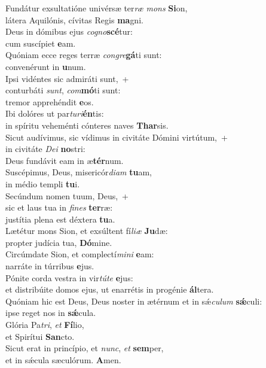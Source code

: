 \evenverse Fundátur exsultatióne univérsæ ter\textit{ræ} \textit{mons} \textbf{Si}on,~\*\\
\evenverse látera Aquilónis, cívitas Regis \textbf{ma}gni.\\
\oddverse Deus in dómibus ejus \textit{co}\textit{gno}\textbf{scé}tur:~\*\\
\oddverse cum suscípiet \textbf{e}am.\\
\evenverse Quóniam ecce reges terræ \textit{con}\textit{gre}\textbf{gá}ti sunt:~\*\\
\evenverse convenérunt in \textbf{u}num.\\
\oddverse Ipsi vidéntes sic admiráti sunt,~+\\
\oddverse  conturbáti \textit{sunt}, \textit{com}\textbf{mó}ti sunt:~\*\\
\oddverse tremor apprehéndit \textbf{e}os.\\
\evenverse Ibi dolóres ut par\textit{tu}\textit{ri}\textbf{én}tis:~\*\\
\evenverse in spíritu veheménti cónteres naves \textbf{Thar}sis.\\
\oddverse Sicut audívimus, sic vídimus in civitáte Dómini virtútum,~+\\
\oddverse  in civitáte \textit{De}\textit{i} \textbf{no}stri:~\*\\
\oddverse Deus fundávit eam in æ\textbf{tér}num.\\
\evenverse Suscépimus, Deus, misericór\textit{di}\textit{am} \textbf{tu}am,~\*\\
\evenverse in médio templi \textbf{tu}i.\\
\oddverse Secúndum nomen tuum, Deus,~+\\
\oddverse  sic et laus tua in \textit{fi}\textit{nes} \textbf{ter}ræ:~\*\\
\oddverse justítia plena est déxtera \textbf{tu}a.\\
\evenverse Lætétur mons Sion, et exsúltent fí\textit{li}\textit{æ} \textbf{Ju}dæ:~\*\\
\evenverse propter judícia tua, \textbf{Dó}mine.\\
\oddverse Circúmdate Sion, et complectí\textit{mi}\textit{ni} \textbf{e}am:~\*\\
\oddverse narráte in túrribus \textbf{e}jus.\\
\evenverse Pónite corda vestra in vir\textit{tú}\textit{te} \textbf{e}jus:~\*\\
\evenverse et distribúite domos ejus, ut enarrétis in progénie \textbf{ál}tera.\\
\oddverse Quóniam hic est Deus, Deus noster in ætérnum et in sǽ\textit{cu}\textit{lum} \textbf{sǽ}culi:~\*\\
\oddverse ipse reget nos in \textbf{sǽ}cula.\\
\evenverse Glória Pa\textit{tri}, \textit{et} \textbf{Fí}lio,~\*\\
\evenverse et Spirítui \textbf{San}cto.\\
\oddverse Sicut erat in princípio, et \textit{nunc}, \textit{et} \textbf{sem}per,~\*\\
\oddverse et in sǽcula sæculórum. \textbf{A}men.\\
